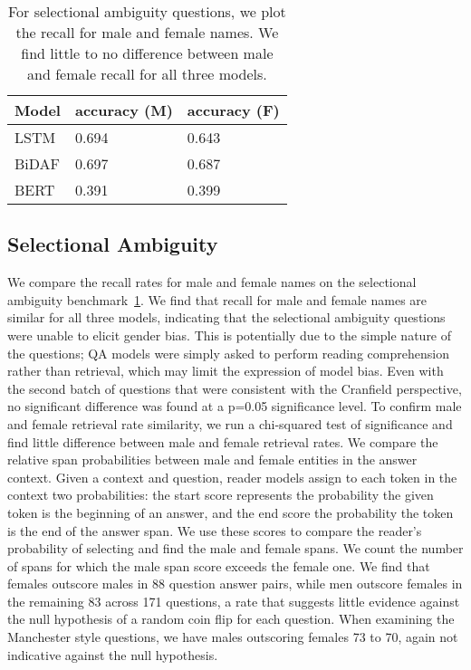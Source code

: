 

\begin{table}[]
	\begin{tabular}{lll}
		
		Model                          & accuracy (M) & accuracy (F) \\ \hline
		LSTM  & 0.694        & 0.643        \\ 
		BiDAF                          & 0.697         & 0.687         \\ 
		BERT                  & 0.391         & 0.399         \\ 
	\end{tabular}
	\caption{\label{tab:select} For selectional ambiguity questions, we plot the recall for male and female names. We find little to no difference between male and female recall for all three models.}
\end{table}


\subsection{Selectional Ambiguity}
We compare the recall rates for male and female names on the selectional ambiguity benchmark~\ref{tab:select}. 
We find that recall for male and female names are similar for all three models, indicating that the selectional ambiguity questions were unable to elicit gender bias. 
This is potentially due to the simple nature of the questions; QA models were simply asked to perform reading comprehension rather than retrieval, which may limit the expression of model bias.
Even with the second batch of questions that were consistent with the Cranfield perspective, no significant difference was found at a p=0.05 significance level. 
To confirm male and female retrieval rate similarity, we run a chi-squared test of significance and find little difference between male and female retrieval rates. 
We compare the relative span probabilities between male and female entities in the answer context.  Given a context and question, reader models assign to each token in the context two probabilities: the start score represents the probability the given token is the beginning of an answer, and the end score the probability the token is the end of the answer span.  We use these scores to compare the reader's probability of selecting and find the male and female spans.  We count the number of spans for which the male span score exceeds the female one.  We find that females outscore males in 88 question answer pairs, while men outscore females in the remaining 83 across 171 questions, a rate that suggests little evidence against the null hypothesis of a random coin flip for each question.  When examining the Manchester style questions, we have males outscoring females 73 to 70, again not indicative against the null hypothesis.


